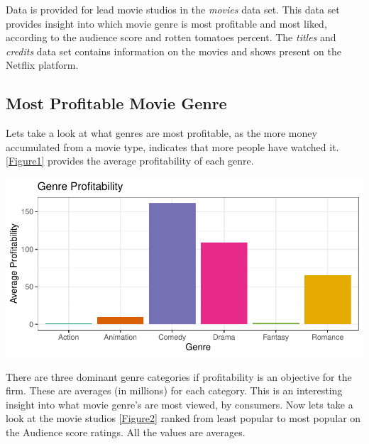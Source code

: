 \documentclass[11pt,preprint, authoryear]{elsarticle}
\let\origfigure\figure
\let\endorigfigure\endfigure
\renewenvironment{figure}[1][2] {
    \expandafter\origfigure\expandafter[H]
} {
    \endorigfigure
}
\numberwithin{equation}{section}
\numberwithin{figure}{section}
\numberwithin{table}{section}
\begin{document}
Data is provided for lead movie studios in the \emph{movies} data set.
This data set provides insight into which movie genre is most profitable
and most liked, according to the audience score and rotten tomatoes
percent. The \emph{titles} and \emph{credits} data set contains
information on the movies and shows present on the Netflix platform.

\hypertarget{most-profitable-movie-genre}{%
\subsection{Most Profitable Movie
Genre}\label{most-profitable-movie-genre}}

Lets take a look at what genres are most profitable, as the more money
accumulated from a movie type, indicates that more people have watched
it. \ref{Figure1} provides the average profitability of each genre.

\begin{figure}[H]

{\centering \includegraphics{Question-4_files/figure-latex/Figure1-1} 

}

\caption{Genre Profitability \label{Figure1}}\label{fig:Figure1}
\end{figure}

There are three dominant genre categories if profitability is an
objective for the firm. These are averages (in millions) for each
category. This is an interesting insight into what movie genre's are
most viewed, by consumers. Now lets take a look at the movie studios
\ref{Figure2} ranked from least popular to most popular on the Audience
score ratings. All the values are averages.
\end{document}
